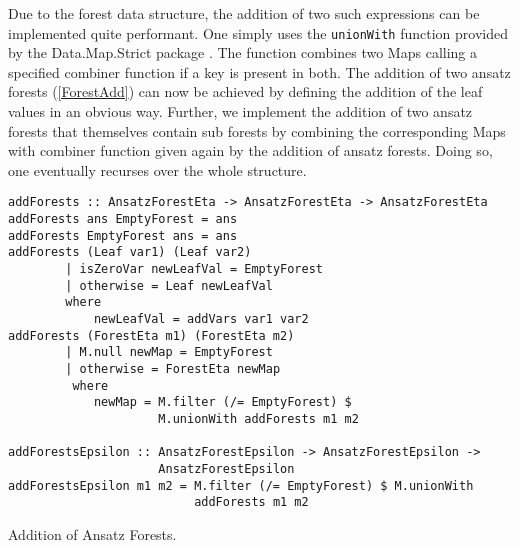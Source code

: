 Due to the forest data structure, the addition of two such expressions can be implemented quite performant. One simply uses the \texttt{unionWith} function provided by the Data.Map.Strict package \cite{HackageMap}. The function combines two Maps calling a specified combiner function if a key is present in both. The addition of two ansatz forests (\ref{ForestAdd}) can now be achieved by defining the addition of the leaf values in an obvious way. Further, we implement the addition of two ansatz forests that themselves contain sub forests by combining the corresponding Maps with combiner function given again by the addition of ansatz forests. Doing so, one eventually recurses over the whole structure. 
\begin{listing}[hbt!] 
\begin{verbatim}
addForests :: AnsatzForestEta -> AnsatzForestEta -> AnsatzForestEta
addForests ans EmptyForest = ans
addForests EmptyForest ans = ans
addForests (Leaf var1) (Leaf var2)
        | isZeroVar newLeafVal = EmptyForest
        | otherwise = Leaf newLeafVal
        where
            newLeafVal = addVars var1 var2
addForests (ForestEta m1) (ForestEta m2)
        | M.null newMap = EmptyForest
        | otherwise = ForestEta newMap
         where
            newMap = M.filter (/= EmptyForest) $
                     M.unionWith addForests m1 m2

addForestsEpsilon :: AnsatzForestEpsilon -> AnsatzForestEpsilon ->
                     AnsatzForestEpsilon
addForestsEpsilon m1 m2 = M.filter (/= EmptyForest) $ M.unionWith
                          addForests m1 m2
\end{verbatim} 
\caption{Addition of Ansatz Forests.}\label{ForestAdd}
\end{listing}\\

